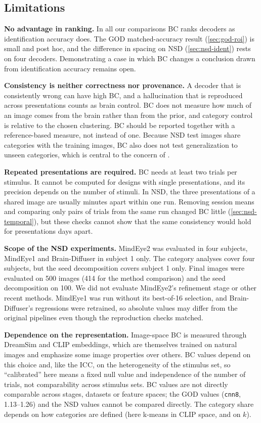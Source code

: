 \documentclass[11pt,a4paper]{article}
\begin{document}
\subsection{Limitations}

\textbf{No advantage in ranking.} In all our comparisons BC ranks decoders as
identification accuracy does. The GOD matched-accuracy result
(\cref{sec:god-roi}) is small and post hoc, and the difference in spacing on
NSD (\cref{sec:nsd-ident}) rests on four decoders. Demonstrating a case in
which BC changes a conclusion drawn from identification accuracy remains open.

\textbf{Consistency is neither correctness nor provenance.} A decoder that is
consistently wrong can have high BC, and a hallucination that is reproduced
across presentations counts as brain control. BC does not measure how much of
an image comes from the brain rather than from the prior, and category control
is relative to the chosen clustering. BC should be reported together with a
reference-based measure, not instead of one. Because NSD test images share categories with the
training images, BC also does not test generalization to unseen categories,
which is central to the concern of \citet{shirakawa2025}.

\textbf{Repeated presentations are required.} BC needs at least two trials per
stimulus. It cannot be computed for designs with single presentations, and its
precision depends on the number of stimuli. In NSD, the three presentations of
a shared image are usually minutes apart within one run. Removing session means
and comparing only pairs of trials from the same run changed BC little
(\cref{sec:nsd-temporal}), but these checks cannot show that the same
consistency would hold for presentations days apart.

\textbf{Scope of the NSD experiments.} MindEye2 was evaluated in four subjects,
MindEye1 and Brain-Diffuser in subject 1 only. The category analyses cover
four subjects, but the seed decomposition covers subject 1 only. Final images were evaluated on 500 images (414 for
the method comparison) and the seed decomposition on 100. We did not evaluate
MindEye2's refinement stage or other recent methods. MindEye1 was run without
its best-of-16 selection, and Brain-Diffuser's regressions were retrained, so
absolute values may differ from the original pipelines even though the
reproduction checks matched.

\textbf{Dependence on the representation.} Image-space BC is measured through
DreamSim and CLIP embeddings, which are themselves trained on natural images and
emphasize some image properties over others. BC values depend on this choice
and, like the ICC, on the heterogeneity of the stimulus set, so ``calibrated''
here means a fixed null value and independence of the number of trials, not
comparability across stimulus sets. BC values are not directly comparable
across stages, datasets or feature spaces; the
GOD values (\texttt{cnn8}, 1.13--1.26) and the NSD values cannot be compared
directly. The category share depends on how categories are defined (here
k-means in CLIP space, and on $k$).
\end{document}
